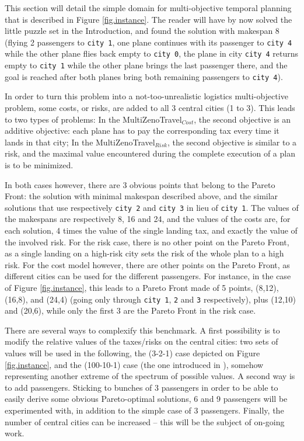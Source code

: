 \documentclass{llncs}
\def\MULTIZENO{{\sc MultiZenoTravel}}
\begin{document}
This section will detail the simple domain for multi-objective temporal planning that is described in Figure \ref{fig.instance}. The reader will have by now solved the little puzzle set in the Introduction, and found the solution with makespan 8 (flying 2 passengers to {\tt city 1}, one plane continues with its passenger to {\tt city 4} while the other plane flies back empty to {\tt city 0}, the plane in city {\tt city 4} returns empty to {\tt city 1} while the other plane brings the last passenger there, and the goal is reached after both planes bring both remaining passengers to {\tt city 4}). 

In order to turn this problem into a not-too-unrealistic logistics multi-objective problem, some costs, or risks, are added to all 3 central cities (1 to 3). This leads to two types of problems: In the \MULTIZENO$_{Cost}$, the second objective is an additive objective: each plane has to pay the corresponding tax every time it lands in that city; In the \MULTIZENO$_{Risk}$, the second objective is similar to a risk, and the maximal value encountered during the complete execution of a plan is to be minimized. 

In both cases however, there are 3 obvious points that belong to the Pareto Front: the solution with minimal makespan described above, and the similar solutions that use respectively {\tt city 2} and {\tt city 3} in lieu of {\tt city 1}. The values of the makespans are respectively 8, 16 and 24, and the values of the costs are, for each solution, 4 times the value of the single landing tax, and exactly the value of the involved risk. For the risk case, there is no other point on the Pareto Front, as a single landing on a high-risk city sets the risk of the whole plan to a high risk. For the cost model however, there are other points on the Pareto Front, as different cities can be used for the different passengers. For instance, in the case of Figure \ref{fig.instance}, this leads to a Pareto Front made of 5 points, (8,12), (16,8), and (24,4) (going only through {\tt city 1}, {\tt 2} and {\tt 3} respectively), plus (12,10) and (20,6), while only the first 3 are the Pareto Front in the risk case.

There are several ways to complexify this benchmark. A first possibility is to modify the relative values of the taxes/risks on the central cities: two sets of values will be used in the following, the (3-2-1) case depicted on Figure \ref{fig.instance}, and the (100-10-1) case (the one introduced in \cite{Schoenauer2006}), somehow representing another extreme of the spectrum of possible values. A second way is to add passengers. Sticking to bunches of 3 passengers in order to be able to easily derive some obvious Pareto-optimal solutions, 6 and 9 passengers will be experimented with, in addition to the simple case of 3 passengers. Finally, the number of central cities can be increased -- this will be the subject of on-going work.
\end{document}
